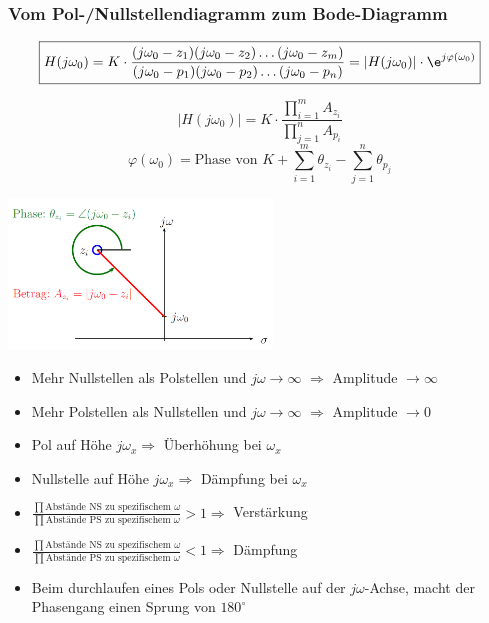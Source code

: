 \subsubsection{Vom Pol-/Nullstellendiagramm zum Bode-Diagramm }
\begin{minipage}[b]{12cm}
  \[\boxed{ H(j\omega_0) = K \cdot \frac{(j\omega_0 - z_1)(j\omega_0-z_2)\ldots(j\omega_0-z_m)}
  {(j\omega_0-p_1)(j\omega_0-p_2)\ldots(j\omega_0-p_n)} = |H(j\omega_0)|\cdot \e^{j\varphi(\omega_0)}}\]

  \[ |H(j\omega_0)| = K \cdot \frac{\prod\limits_{i=1}^{m} A_{z_i}}{\prod\limits_{j=1}^{n} A_{p_i}}\]
  \[ \varphi(\omega_0) = \text{Phase von }K + \sum\limits_{i=1}^m \theta_{z_i} - \sum\limits_{j=1}^n \theta_{p_j}\]
\end{minipage}
\begin{minipage}[b]{7cm}
  \includegraphics[width=7cm]{./images/PN_Diagramm.png}
\end{minipage}
\begin{itemize}
  \item Mehr Nullstellen als Polstellen und $j \omega \rightarrow\infty$
        $\Longrightarrow$ Amplitude $\rightarrow\infty$
  \item Mehr Polstellen als Nullstellen und $j \omega \rightarrow\infty$
        $\Longrightarrow$ Amplitude $\rightarrow 0$
  \item Pol auf Höhe $j\omega_x \Longrightarrow$ Überhöhung bei $\omega_x$
  \item Nullstelle auf Höhe $j\omega_x \Longrightarrow$ Dämpfung bei $\omega_x$
  \item $\frac{\prod{\text{Abstände NS zu spezifischem
        $\omega$}}}{\prod{\text{Abstände PS zu spezifischem
        $\omega$}}} > 1 \Longrightarrow$ Verstärkung
  \item $\frac{\prod{\text{Abstände NS zu spezifischem
        $\omega$}}}{\prod{\text{Abstände PS zu spezifischem
        $\omega$}}} < 1 \Longrightarrow$ Dämpfung
  \item Beim durchlaufen eines Pols oder Nullstelle auf der $j\omega$-Achse, macht der Phasengang
        einen Sprung von $180^{\circ}$
\end{itemize}

